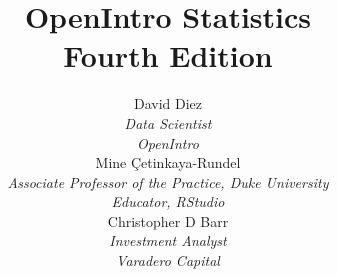 
\title{\huge OpenIntro Statistics\vspace{1.5mm} \\
    \Large Fourth Edition}
\author{David Diez \\
\small\emph{Data Scientist}\\
\small\emph{OpenIntro} \\[6mm]
Mine \c{C}etinkaya-Rundel \\
\small\emph{Associate Professor of the Practice,
    Duke University} \\
\small\emph{Educator, RStudio} \\[6mm]
Christopher D Barr \\
\small\emph{Investment Analyst} \\
\small\emph{Varadero Capital} \\
}
